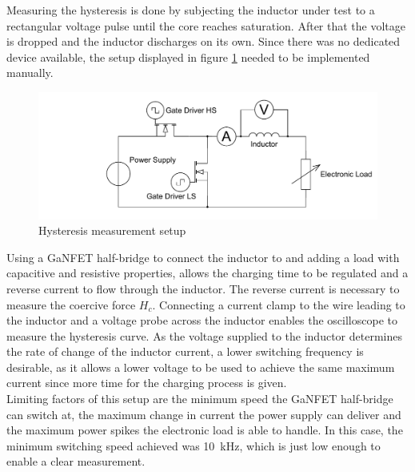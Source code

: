 Measuring the hysteresis is done by subjecting the inductor under test to a rectangular voltage pulse until the core reaches saturation. After that the voltage is dropped and the inductor discharges on its own. Since there was no dedicated device available, the setup displayed in figure \ref{fig:hysteresis_measurement_setup} needed to be implemented manually.
\begin{figure}[H]
    \centering
    \includegraphics[width=1\linewidth]{Bilder/Kapitel3/Hysteresis_Measurement_Setup.pdf}
    \caption{Hysteresis measurement setup}
    \label{fig:hysteresis_measurement_setup}
\end{figure}
Using a \ac{GaNFET} half-bridge to connect the inductor to and adding a load with capacitive and resistive properties, allows the charging time to be regulated and a reverse current to flow through the inductor. The reverse current is necessary to measure the coercive force $H_c$. Connecting a current clamp to the wire leading to the inductor and a voltage probe across the inductor enables the oscilloscope to measure the hysteresis curve. As the voltage supplied to the inductor determines the rate of change of the inductor current, a lower switching frequency is desirable, as it allows a lower voltage to be used to achieve the same maximum current since more time for the charging process is given.\\
Limiting factors of this setup are the minimum speed the \ac{GaNFET} half-bridge can switch at, the maximum change in current the power supply can deliver and the maximum power spikes the electronic load is able to handle. In this case, the minimum switching speed achieved was \SI{10}{\kilo\Hz}, which is just low enough to enable a clear measurement.\\

